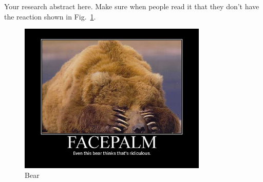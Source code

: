 Your research abstract here. Make sure when people read it that they don't have the reaction shown in Fig.~\ref{fig:bear}.

\begin{figure}
\centering
\includegraphics[width=0.8\textwidth]{EvenThisBearThinksThisIsRidiculous.jpg}
\caption{Bear\label{fig:bear}}
\end{figure} 
